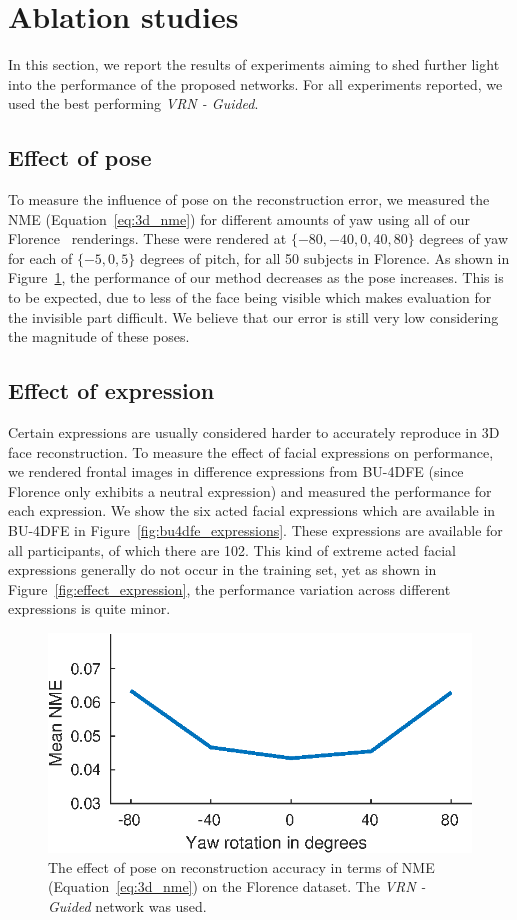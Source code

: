 \section{Ablation studies}
\label{chapter:face:sec:ablation}

In this section, we report the results of experiments aiming to shed
further light into the performance of the proposed networks. For all
experiments reported, we used the best performing \textit{VRN -
  Guided}.

\subsection{Effect of pose}

To measure the influence of pose on the reconstruction error, we
measured the NME (Equation~\ref{eq:3d_nme}) for different amounts of
yaw using all of our Florence~\cite{masi2d3dFaceData}
renderings. These were rendered at $\{-80, -40, 0, 40, 80\}$ degrees
of yaw for each of $\{-5, 0, 5\}$ degrees of pitch, for all 50
subjects in Florence. As shown in Figure~\ref{fig:effect_pose}, the
performance of our method decreases as the pose increases. This is to
be expected, due to less of the face being visible which makes
evaluation for the invisible part difficult. We believe that our error
is still very low considering the magnitude of these poses.



\subsection{Effect of expression} Certain expressions are usually
considered harder to accurately reproduce in 3D face reconstruction.
To measure the effect of facial expressions on performance, we
rendered frontal images in difference expressions from BU-4DFE (since
Florence only exhibits a neutral expression) and measured the
performance for each expression. We show the six acted facial
expressions which are available in BU-4DFE in
Figure~\ref{fig:bu4dfe_expressions}. These expressions are available
for all participants, of which there are 102. This kind of extreme
acted facial expressions generally do not occur in the training set,
yet as shown in Figure~\ref{fig:effect_expression}, the performance
variation across different expressions is quite minor.

\begin{figure}
  \centering
  \includegraphics[width=0.6\linewidth]{curves/ablation_pose.eps}
  \caption[Effect of pose]{The effect of pose on reconstruction
    accuracy in terms of NME (Equation~\ref{eq:3d_nme}) on the
    Florence dataset. The \textit{VRN - Guided} network was used.}
  \label{fig:effect_pose}
\end{figure}

